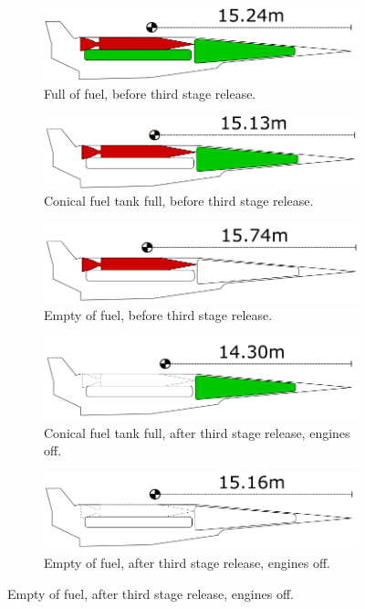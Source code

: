 		
		\begin{figure}
			\begin{subfigure}{.5\textwidth}
				\centering
				\includegraphics[width=0.9\linewidth]{figures/3_vehicle_design/CG1}
				\caption{Full of fuel, before third stage release.}
			\end{subfigure}
			\begin{subfigure}{.5\textwidth}
				\centering
				\includegraphics[width=0.9\linewidth]{figures/3_vehicle_design/CG2}
				\caption{Conical fuel tank full, before third stage release.}
				
			\end{subfigure}
			\begin{subfigure}{.5\textwidth}
				\centering
				\includegraphics[width=0.9\linewidth]{figures/3_vehicle_design/CG3}
				\caption{Empty of fuel, before third stage release.}
				
			\end{subfigure}
			\begin{subfigure}{.5\textwidth}
				\centering
				\includegraphics[width=0.9\linewidth]{figures/3_vehicle_design/CG4}
				\caption{Conical fuel tank full, after third stage release, engines off.}
				
			\end{subfigure}
			\begin{subfigure}{.5\textwidth}
				\centering
				\includegraphics[width=0.9\linewidth]{figures/3_vehicle_design/CG5}
				\caption{Empty of fuel, after third stage release, engines off.}
				

\end{subfigure}
\end{figure}
